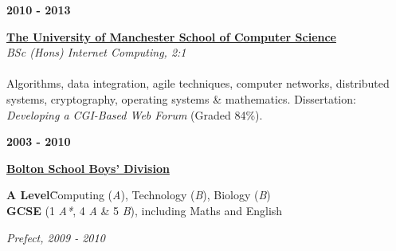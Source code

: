 \begin{minipage}[t]{0.20\linewidth}
    \textbf{2010 - 2013}
\end{minipage} 
\begin{minipage}[t]{0.80\linewidth}
    \textbf{\href{https://en.wikipedia.org/wiki/School_of_Computer_Science,_University_of_Manchester}{The University of Manchester School of Computer Science}} \\
    \emph{BSc (Hons) Internet Computing, 2:1} \\ 
    \\
    Algorithms, data integration, agile techniques, computer networks, distributed systems, cryptography, operating systems \& mathematics. Dissertation: \emph{Developing a CGI-Based Web Forum} (Graded 84\%).
\end{minipage}

\vspace{5mm}

\begin{minipage}[t]{0.20\linewidth}
    \textbf{2003 - 2010}
\end{minipage} 
\begin{minipage}[t]{0.80\linewidth}
    \textbf{\href{http://www.boltonschool.org/}{Bolton School Boys' Division}}
    \begin{tabbing}
        \textbf{A Level}\hspace{5mm}\= Computing (\emph{A}), Technology (\emph{B}), Biology (\emph{B})\\
        \textbf{GCSE}  (1 \emph{A*}, 4 \emph{A} \& 5 \emph{B}), including Maths and English
    \end{tabbing}
    \emph{Prefect, 2009 - 2010}
\end{minipage}
